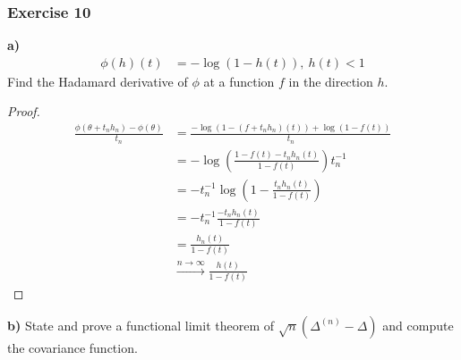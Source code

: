 \documentclass{article}
\begin{document}
\subsubsection{Exercise 10}
\textbf{a)}
\begin{align*}
    \phi(h)(t) &= - \log(1-h(t)) ,\ h(t) < 1
\end{align*}
Find the Hadamard derivative of $\phi$ at a function $f$ in the direction $h$.
\begin{proof}
\begin{align*}
    \frac{\phi(\theta + t_n h_n) - \phi(\theta)}{t_n} &= \frac{-\log(1-(f+t_n h_n)(t)) + \log (1-f(t))}{t_n} \\
    &= -\log\left( \frac{1-f(t) - t_n h_n(t)}{1-f(t)} \right)t_n^{-1}\\
    &= -t_n^{-1} \log\left( 1 - \frac{t_n h_n(t)}{1-f(t)}\right) \\
    &= -t_n^{-1} \frac{-t_n h_n(t)}{1-f(t)} \\
    &= \frac{h_n(t)}{1-f(t)} \\
    &\overset{n\rightarrow \infty}{\rightarrow} \frac{h(t)}{1-f(t)}
\end{align*}
\end{proof}
\textbf{b)}
State and prove a functional limit theorem of $\sqrt{n}(\Delta^{(n)} - \Delta)$ and compute the covariance function.
\end{document}
